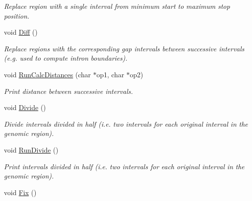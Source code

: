 \begin{CompactItemize}
\begin{CompactList}\small\item\em Replace region with a single interval from minimum start to maximum stop position. \item\end{CompactList}\item 
\hypertarget{classGenomicRegionSAM_ca38b04fa916ae4c9c28c36f537136ba}{
void \hyperlink{classGenomicRegionSAM_ca38b04fa916ae4c9c28c36f537136ba}{Diff} ()}
\label{classGenomicRegionSAM_ca38b04fa916ae4c9c28c36f537136ba}

\begin{CompactList}\small\item\em Replace regions with the corresponding gap intervals between successive intervals (e.g. used to compute intron boundaries). \item\end{CompactList}\item 
\hypertarget{classGenomicRegionSAM_fc9c7ec17be517dd5b1ad7cb62f58826}{
void \hyperlink{classGenomicRegionSAM_fc9c7ec17be517dd5b1ad7cb62f58826}{RunCalcDistances} (char $\ast$op1, char $\ast$op2)}
\label{classGenomicRegionSAM_fc9c7ec17be517dd5b1ad7cb62f58826}

\begin{CompactList}\small\item\em Print distance between successive intervals. \item\end{CompactList}\item 
\hypertarget{classGenomicRegionSAM_7c16ba87be562950021d3f19eb14ac5e}{
void \hyperlink{classGenomicRegionSAM_7c16ba87be562950021d3f19eb14ac5e}{Divide} ()}
\label{classGenomicRegionSAM_7c16ba87be562950021d3f19eb14ac5e}

\begin{CompactList}\small\item\em Divide intervals divided in half (i.e. two intervals for each original interval in the genomic region). \item\end{CompactList}\item 
\hypertarget{classGenomicRegionSAM_dd2ada73e241f593dcdcdfca97df1eb5}{
void \hyperlink{classGenomicRegionSAM_dd2ada73e241f593dcdcdfca97df1eb5}{RunDivide} ()}
\label{classGenomicRegionSAM_dd2ada73e241f593dcdcdfca97df1eb5}

\begin{CompactList}\small\item\em Print intervals divided in half (i.e. two intervals for each original interval in the genomic region). \item\end{CompactList}\item 
\hypertarget{classGenomicRegionSAM_d955a6a512678613b4a42d2db0d3f549}{
void \hyperlink{classGenomicRegionSAM_d955a6a512678613b4a42d2db0d3f549}{Fix} ()}
\label{classGenomicRegionSAM_d955a6a512678613b4a42d2db0d3f549}


\end{CompactItemize}
